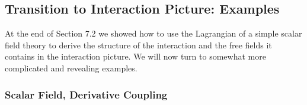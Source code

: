 
\subsection{Transition to Interaction Picture: Examples}

At the end of Section 7.2 we showed how to use the Lagrangian of a
simple scalar field theory to derive the structure of the interaction and
the free fields it contains in the interaction picture. We will now turn to
somewhat more complicated and revealing examples.

\subsubsection*{Scalar Field, Derivative Coupling}

